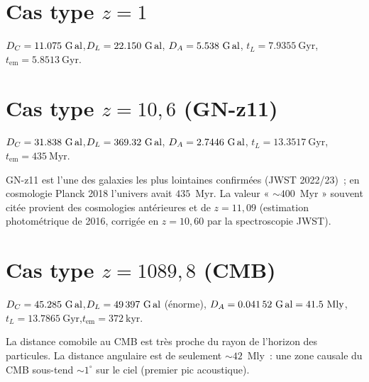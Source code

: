 \documentclass[11pt,a4paper,openany]{report}
\newcommand{\Gly}{\text{G\,al}}
\newcommand{\Gyr}{\text{Gyr}}
\begin{document}
\section{Cas type \texorpdfstring{$z=1$}{z=1}}

\begin{tcolorbox}[numerique]
$D_{C} = \num{11.075}~\Gly$,\quad $D_{L} = \num{22.150}~\Gly$,\quad
$D_{A} = \num{5.538}~\Gly$,\quad
$t_{L} = \num{7.9355}~\Gyr$,\quad $t_{\text{em}} = \num{5.8513}~\Gyr$.
\end{tcolorbox}

\section{Cas type \texorpdfstring{$z=10{,}6$}{z=10.6} (GN-z11)}

\begin{tcolorbox}[numerique]
$D_{C} = \num{31.838}~\Gly$,\quad $D_{L} = \num{369.32}~\Gly$,\quad
$D_{A} = \num{2.7446}~\Gly$,\quad
$t_{L} = \num{13.3517}~\Gyr$,\quad $t_{\text{em}} = \num{435}~\text{Myr}$.

\medskip
GN-z11 est l'une des galaxies les plus lointaines confirmées (JWST 2022/23)~;
en cosmologie Planck 2018 l'univers avait $435$~Myr. La valeur « $\sim 400$~Myr »
souvent citée provient des cosmologies antérieures et de $z = 11{,}09$
(estimation photométrique de 2016, corrigée en $z = 10{,}60$ par la
spectroscopie JWST).
\end{tcolorbox}

\section{Cas type \texorpdfstring{$z=1089{,}8$}{z=1089.8} (CMB)}

\begin{tcolorbox}[numerique]
$D_{C} = \num{45.285}~\Gly$,\quad $D_{L} = \num{49397}~\Gly$ (énorme),\quad
$D_{A} = \num{0.04152}~\Gly = \num{41.5}~\text{Mly}$,\quad
$t_{L} = \num{13.7865}~\Gyr$,\quad $t_{\text{em}} = \num{372}~\text{kyr}$.

\medskip
La distance comobile au CMB est très proche du rayon de l'horizon des
particules. La distance angulaire est de seulement $\sim 42$~Mly~: une zone
causale du CMB sous-tend $\sim 1^{\circ}$ sur le ciel (premier pic
acoustique).
\end{tcolorbox}

\clearpage

\end{document}
